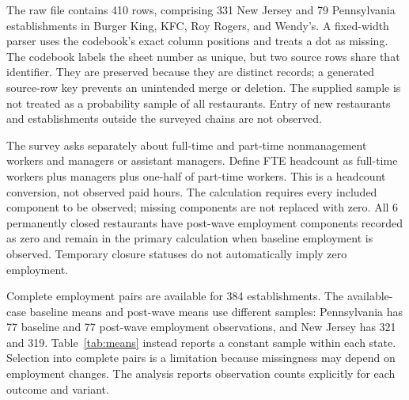 \documentclass[11pt]{article}
\newcommand{\result}[2]{#2}
\begin{document}
The raw file contains \result{audit.n_raw}{410} rows, comprising \result{nj.n_raw}{331} New Jersey and \result{pa.n_raw}{79} Pennsylvania establishments in Burger King, KFC, Roy Rogers, and Wendy's. A fixed-width parser uses the codebook's exact column positions and treats a dot as missing. The codebook labels the sheet number as unique, but two source rows share that identifier. They are preserved because they are distinct records; a generated source-row key prevents an unintended merge or deletion. The supplied sample is not treated as a probability sample of all restaurants. Entry of new restaurants and establishments outside the surveyed chains are not observed. %

The survey asks separately about full-time and part-time nonmanagement workers and managers or assistant managers. Define FTE headcount as full-time workers plus managers plus one-half of part-time workers. This is a headcount conversion, not observed paid hours. The calculation requires every included component to be observed; missing components are not replaced with zero. All \result{audit.permanent_closed}{6} permanently closed restaurants have post-wave employment components recorded as zero and remain in the primary calculation when baseline employment is observed. Temporary closure statuses do not automatically imply zero employment. %

Complete employment pairs are available for \result{primary.n}{384} establishments. The available-case baseline means and post-wave means use different samples: Pennsylvania has \result{pa.n_pre}{77} baseline and \result{pa.n_post}{77} post-wave employment observations, and New Jersey has \result{nj.n_pre}{321} and \result{nj.n_post}{319}. Table~\ref{tab:means} instead reports a constant sample within each state. Selection into complete pairs is a limitation because missingness may depend on employment changes. The analysis reports observation counts explicitly for each outcome and variant. %
\end{document}
